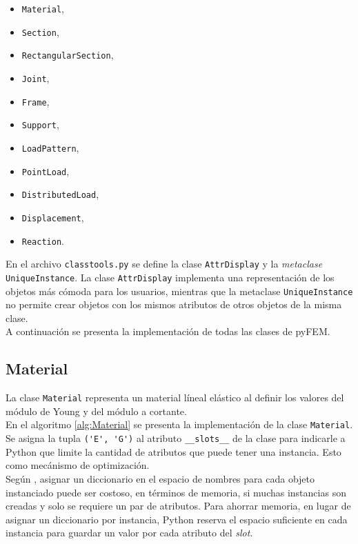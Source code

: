 \begin{multicols}{2}
  \setlength{\columnseprule}{0pt}
  \begin{itemize}
  \item \verb|Material|,
  \item \verb|Section|,
  \item \verb|RectangularSection|,
  \item \verb|Joint|,
  \item \verb|Frame|,
  \item \verb|Support|,
  \item \verb|LoadPattern|,
  \item \verb|PointLoad|,
  \item \verb|DistributedLoad|,
  \item \verb|Displacement|,
  \item \verb|Reaction|.
  \end{itemize}
\end{multicols}

En el archivo \verb|classtools.py| se define la clase \verb|AttrDisplay| y la \emph{metaclase} \verb|UniqueInstance|. La clase \verb|AttrDisplay| implementa una representación de los objetos más cómoda para los usuarios, mientras que la metaclase \verb|UniqueInstance| no permite crear objetos con los mismos atributos de otros objetos de la misma clase.\\

A continuación se presenta la implementación de todas las clases de pyFEM.

\subsection{Material}
La clase \verb|Material| representa un material líneal elástico al definir los valores del módulo de Young y del módulo a cortante.\\

En el algoritmo \ref{alg:Material} se presenta la implementación de la clase \verb|Material|. Se asigna la tupla \verb|('E', 'G')| al atributo \verb|__slots__| de la clase para indicarle a Python que limite la cantidad de atributos que puede tener una instancia. Esto como mecánismo de optimización.\\

Según \cite{lutz2013python}, asignar un diccionario en el espacio de nombres para cada objeto instanciado puede ser costoso, en términos de memoria, si muchas instancias son creadas y solo se requiere un par de atributos. Para ahorrar memoria, en lugar de asignar un diccionario por instancia, Python reserva el espacio suficiente en cada instancia para guardar un valor por cada atributo del \emph{slot}.\\

